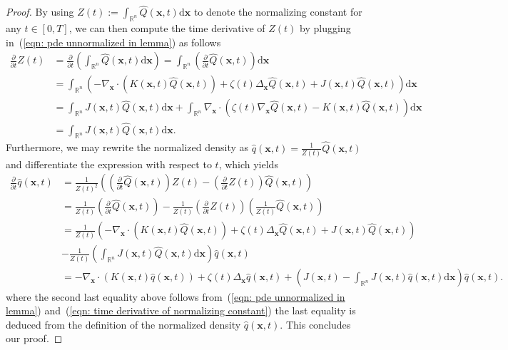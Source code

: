 \documentclass{article}
\numberwithin{equation}{section}
\def\eqref#1{(\ref{#1})}
\newcommand{\dif}{{\mathrm{d}}}
\def\vx{{\bm{x}}}
\begin{document}
\begin{proof}
    By using $Z(t) := \int_{\mathbb{R}^n}\widehat{Q}(\vx,t)\dif\vx$ to denote the normalizing constant for any $t \in [0,T]$, we can then compute the time derivative of $Z(t)$ by plugging in~\eqref{eqn: pde unnormalized in lemma} as follows
    \begin{equation}
    \label{eqn: time derivative of normalizing constant}
    \begin{aligned}
    \frac{\partial}{\partial t}Z(t) &= \frac{\partial}{\partial t}\left(\int_{\mathbb{R}^n}\widehat{Q}(\vx,t)\dif\vx\right) = \int_{\mathbb{R}^n}\left(\frac{\partial}{\partial t}\widehat{Q}(\vx,t)\right)\dif\vx\\
    &=\int_{\mathbb{R}^n}\left(-\nabla_{\vx} \cdot \left(K(\vx,t)\widehat{Q}(\vx,t)\right) + \zeta(t)\Delta_{\vx}\widehat{Q}(\vx,t) + J(\vx,t)\widehat{Q}(\vx,t)\right)\dif\vx\\
    &=\int_{\mathbb{R}^n}J(\vx,t)\widehat{Q}(\vx,t)\dif\vx + \int_{\mathbb{R}^n}\nabla_{\vx} \cdot \left(\zeta(t)\nabla_{\vx}\widehat{Q}(\vx,t) - K(\vx,t)\widehat{Q}(\vx,t)\right)\dif\vx\\
    &=\int_{\mathbb{R}^n}J(\vx,t)\widehat{Q}(\vx,t)\dif\vx.
    \end{aligned}    
    \end{equation}
    Furthermore, we may rewrite the normalized density as $\widehat{q}(\vx,t) = \frac{1}{Z(t)}\widehat{Q}(\vx,t)$ and differentiate the expression with respect to $t$, which yields
    \begin{equation*}
    \begin{aligned}
    \frac{\partial}{\partial t}\widehat{q}(\vx,t) &= \frac{1}{Z(t)^2}\left(\left(\frac{\partial}{\partial t}\widehat{Q}(\vx,t)\right)Z(t) - \left(\frac{\partial}{\partial t}Z(t)\right)\widehat{Q}(\vx,t)\right)\\   
    &= \frac{1}{Z(t)}\left(\frac{\partial}{\partial t}\widehat{Q}(\vx,t)\right) - \frac{1}{Z(t)}\left(\frac{\partial}{\partial t}Z(t)\right)\left(\frac{1}{Z(t)}\widehat{Q}(\vx,t)\right)\\
    &= \frac{1}{Z(t)}\left(-\nabla_{\vx} \cdot \left(K(\vx,t)\widehat{Q}(\vx,t)\right) + \zeta(t)\Delta_{\vx}\widehat{Q}(\vx,t) + J(\vx,t)\widehat{Q}(\vx,t)\right)\\
    &-\frac{1}{Z(t)}\left(\int_{\mathbb{R}^n}J(\vx,t)\widehat{Q}(\vx,t)\dif\vx\right)\widehat{q}(\vx,t)\\
    &= -\nabla_{\vx} \cdot \left(K(\vx,t)\widehat{q}(\vx,t)\right) + \zeta(t)\Delta_{\vx}\widehat{q}(\vx,t) + \left(J(\vx,t) - \int_{\mathbb{R}^n}J(\vx,t)\widehat{q}(\vx,t)\dif \vx\right)\widehat{q}(\vx,t).
    \end{aligned}
    \end{equation*}
    where the second last equality above follows from~\eqref{eqn: pde unnormalized in lemma} and~\eqref{eqn: time derivative of normalizing constant} the last equality is deduced from the definition of the normalized density $\widehat{q}(\vx,t)$. This concludes our proof.
\end{proof}
\end{document}
